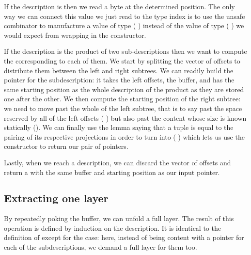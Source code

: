 
If the description is  then we read a byte at the
determined position. The only way we can connect this value we just
read to the type index is to use the unsafe combinator
 to manufacture a value of type
( ) instead of the value of type
( )
we would expect from wrapping  in the  constructor.



If the description is the product of two sub-descriptions then we
want to compute the  corresponding to
each of them.
%
We start by splitting the vector of offsets to distribute them between
the left and right subtrees.
%
We can readily build the pointer for the  subdescription:
it takes the left offsets, the buffer, and has the same starting position
as the whole description of the product as they are stored one after the other.
%
We then compute the starting position of the right subtree: we need to
move past the whole of the left subtree, that is to say past the space
reserved by all of the left offsets ( )
but also past the content whose size is known statically ().
%
We can finally use the lemma  saying that a tuple
is equal to the pairing of its respective projections
in order to turn  into
(  \IdrisData{\#}  )
which lets us use the  constructor \IdrisData{(\#)} to return our
pair of pointers.


Lastly, when we reach a  description, we can discard the
vector of offsets and return a  with the same buffer
and starting position as our input pointer.

\subsection{Extracting one layer}

By repeatedly poking the buffer, we can unfold a full layer.
The result of this operation is defined by induction
on the description. It is identical to the definition of
 except for the  case:
here, instead of being content with a pointer for each of the
subdescriptions, we demand a full layer for them too.

